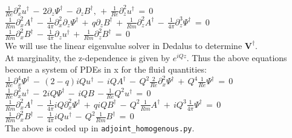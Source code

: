 \documentclass[letterpaper,12pt]{article}
\newcommand\reye{\mathrel{Re}}
\newcommand\reym{\mathrel{Rm}}
\begin{document}
$\frac{1}{\reye}\partial_x^2 u^\dagger \, - \, 2 \partial_z \Psi^\dagger \, - \, \partial_z B^\dagger, \, + \, \frac{1}{\reye}\partial_z^2 u^\dagger \, = \, 0$ \\

$\frac{1}{\reym} \partial_x^2 A^\dagger \, - \, \frac{1}{4\pi} \partial_x^2 \partial_z \Psi^\dagger \, + \, q \partial_z B^\dagger  \,+ \, \frac{1}{\reym} \partial_z^2 A^\dagger \, - \, \frac{1}{4\pi} \partial_z^3 \Psi^\dagger \, = \, 0$ \\

$\frac{1}{\reym} \partial_x^2 B^\dagger \, - \, \frac{1}{4\pi} \partial_z u^\dagger \, + \, \frac{1}{\reym} \partial_z^2 B^\dagger \, = \, 0$ \\

We will use the linear eigenvalue solver in Dedalus to determine $\mathbf{V}^\dagger$. \\

At marginality, the z-dependence is given by $e^{iQz}$. Thus the above equations become a system of PDEs in x for the fluid quantities: \\

$\frac{1}{\reye}\partial_x^4 \Psi^\dagger \, - \, (2 - q) i Q u^\dagger \, - \,  i Q A^\dagger \, - \, Q^2 \frac{2}{\reye} \partial_x^2 \Psi^\dagger \, + \, Q^4 \frac{1}{\reye} \Psi^\dagger \, = \, 0$ \\

$\frac{1}{\reye}\partial_x^2 u^\dagger \, - \, 2 i Q \Psi^\dagger \, - \, i Q B \, - \frac{1}{\reye} Q^2 u^\dagger \, = \, 0$ \\

$\frac{1}{\reym} \partial_x^2 A^\dagger \, - \, \frac{1}{4\pi} i Q \partial_x^2 \Psi^\dagger \, + \, q i Q B^\dagger \, - \, Q^2 \frac{1}{\reym} A^\dagger \, + \, i Q^3 \frac{1}{4\pi} \Psi^\dagger \, = \, 0$ \\

$\frac{1}{\reym} \partial_x^2 B^\dagger \, - \, \frac{1}{4\pi} i Q u^\dagger \, - \, Q^2 \frac{1}{\reym} B^\dagger \, = \, 0$ \\

The above is coded up in \texttt{adjoint\_homogenous.py}.




\end{document}

